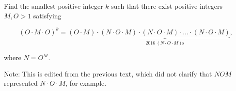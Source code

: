 Find the smallest positive integer $k$ such that there exist positive integers $M,O>1$ satisfying

\[ (O\cdot M\cdot O)^k=(O\cdot M)\cdot \underbrace{(N\cdot O\cdot M)\cdot (N\cdot O\cdot M)\cdot \ldots \cdot (N\cdot O\cdot M)}_{2016\ (N\cdot O\cdot M)\text{s}}, \]

where $N=O^M$.

Note: This is edited from the previous text, which did not clarify that $NOM$ represented $N\cdot O\cdot M$, for example.
